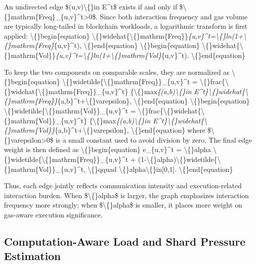 \documentclass{article}
\begin{document}
An undirected edge \$(u,v)\textbackslash\{\}in E^t\$ exists if and only if \$\textbackslash\{\}mathrm\{Freq\}\_\{u,v\}^t>0\$. Since both interaction frequency and gas volume are typically long-tailed in blockchain workloads, a logarithmic transform is first applied:
\textbackslash\{\}begin\{equation\}
\textbackslash\{\}widehat\{\textbackslash\{\}mathrm\{Freq\}\}\emph{\{u,v\}^t=\textbackslash\{\}ln(1+\textbackslash\{\}mathrm\{Freq\}}\{u,v\}^t),
\textbackslash\{\}end\{equation\}
\textbackslash\{\}begin\{equation\}
\textbackslash\{\}widehat\{\textbackslash\{\}mathrm\{Vol\}\}\emph{\{u,v\}^t=\textbackslash\{\}ln(1+\textbackslash\{\}mathrm\{Vol\}}\{u,v\}^t).
\textbackslash\{\}end\{equation\}

To keep the two components on comparable scales, they are normalized as
\textbackslash\{\}begin\{equation\}
\textbackslash\{\}widetilde\{\textbackslash\{\}mathrm\{Freq\}\}\_\{u,v\}^t
=
\textbackslash\{\}frac\{\textbackslash\{\}widehat\{\textbackslash\{\}mathrm\{Freq\}\}\_\{u,v\}^t\}
\{\textbackslash\{\}max\emph{\{(a,b)\textbackslash\{\}in E^t\}\textbackslash\{\}widehat\{\textbackslash\{\}mathrm\{Freq\}\}}\{a,b\}^t+\textbackslash\{\}varepsilon\},
\textbackslash\{\}end\{equation\}
\textbackslash\{\}begin\{equation\}
\textbackslash\{\}widetilde\{\textbackslash\{\}mathrm\{Vol\}\}\_\{u,v\}^t
=
\textbackslash\{\}frac\{\textbackslash\{\}widehat\{\textbackslash\{\}mathrm\{Vol\}\}\_\{u,v\}^t\}
\{\textbackslash\{\}max\emph{\{(a,b)\textbackslash\{\}in E^t\}\textbackslash\{\}widehat\{\textbackslash\{\}mathrm\{Vol\}\}}\{a,b\}^t+\textbackslash\{\}varepsilon\},
\textbackslash\{\}end\{equation\}
where \$\textbackslash\{\}varepsilon>0\$ is a small constant used to avoid division by zero. The final edge weight is then defined as
\textbackslash\{\}begin\{equation\}
e\_\{u,v\}^t
=
\textbackslash\{\}alpha \textbackslash\{\}widetilde\{\textbackslash\{\}mathrm\{Freq\}\}\_\{u,v\}^t
+
(1-\textbackslash\{\}alpha)\textbackslash\{\}widetilde\{\textbackslash\{\}mathrm\{Vol\}\}\_\{u,v\}^t,
\textbackslash\{\}qquad
\textbackslash\{\}alpha\textbackslash\{\}in[0,1].
\textbackslash\{\}end\{equation\}

Thus, each edge jointly reflects communication intensity and execution-related interaction burden. When \$\textbackslash\{\}alpha\$ is larger, the graph emphasizes interaction frequency more strongly; when \$\textbackslash\{\}alpha\$ is smaller, it places more weight on gas-aware execution significance.

\subsection{Computation-Aware Load and Shard Pressure Estimation}\label{sec:computation-aware-load-and-shard-pressure-estimation}
\end{document}
